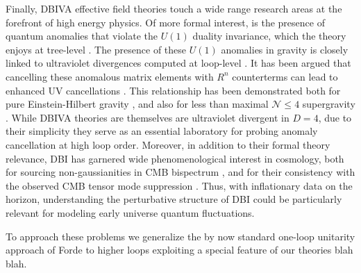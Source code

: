 \documentclass[12pt,letter]{article}
\begin{document}
Finally, DBIVA effective field theories touch a wide range research areas at the forefront of high energy physics. Of more formal interest, is the presence of quantum anomalies that violate the $U(1)$ duality invariance, which the theory enjoys at tree-level \cite{Elvang:2020kuj}. The presence of these $U(1)$ anomalies in gravity is closely linked to ultraviolet divergences computed at loop-level \cite{Bern:2007xj,Carrasco:2013ypa,Craig:2019zkf,Monteiro:2022nqt}. It has been argued that cancelling these anomalous matrix elements with $R^n$ counterterms can lead to enhanced UV cancellations \cite{Bern:2017tuc,Bern:2017rjw,Bern:2019isl}. This relationship has been demonstrated both for pure Einstein-Hilbert gravity \cite{Goroff:1985sz}, and also for less than maximal $\mathcal{N}\leq 4$ supergravity \cite{Bern:2013uka}. While DBIVA theories are themselves are ultraviolet divergent in $D=4$, due to their simplicity they serve as an essential laboratory for probing anomaly cancellation at high loop order. Moreover, in addition to their formal theory relevance, DBI has garnered wide phenomenological interest in cosmology, both for sourcing non-gaussianities in CMB bispectrum \cite{Alishahiha:2004eh,Creminelli:2005hu,Fergusson:2008ra}, and for their consistency with the observed CMB tensor mode suppression \cite{Carrasco:2015pla,Carrasco:2015rva,Carrasco:2015uma,BICEP:2021xfz,Kallosh:2021mnu}. Thus, with inflationary data on the horizon, understanding the perturbative structure of DBI could be particularly relevant for modeling early universe quantum fluctuations. 

To approach these problems we generalize the by now standard one-loop unitarity approach of Forde to higher loops exploiting a special feature of our theories blah blah.
\end{document}
